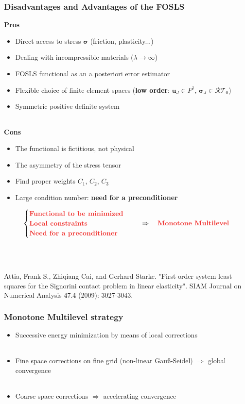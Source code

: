 \documentclass[8pt, oneside]{beamer}   	%
\newcommand{\bu}{\textbf{u}}
\newcommand{\bsigma}{\boldsymbol{\sigma}}
\newcommand{\RT}{\mathcal{RT}}
\newcommand{\colo}{\color{orange}}
\newcommand{\titlecolor}[1]{\frametitle{\textcolor{dkgrey}{ \textbf{#1}}}}
\begin{document}
\begin{frame}
\titlecolor{Disadvantages and Advantages of the FOSLS}
 \textbf{Pros}
\begin{itemize} 
\item Direct access to stress $\bsigma$ (friction, plasticity...)
\item Dealing with incompressible materials ($\lambda \to \infty$)
\item FOSLS functional as an a posteriori error estimator
\item Flexible choice of finite element spaces (\textbf{low order}: $\bu_J \in P^1$, $\bsigma_J \in \RT_0$)
\item Symmetric positive definite system
\end{itemize}
${}$\\
 \textbf{Cons}
\begin{itemize} 
\item The functional is fictitious, not physical
\item The asymmetry of the stress tensor
\item Find proper weights $C_1$, $C_2$, $C_3$
\item Large condition number:  \colo \textbf{need for a preconditioner}
\end{itemize}
\begin{align*}
\begin{cases}
 \colo \textbf{Functional to be minimized }\\
 \colo   \textbf{Local constraints}\\
 \colo \textbf{Need for a preconditioner}
\end{cases}
\quad \Rightarrow \quad \colo \textbf{Monotone Multilevel}
\end{align*}${}$\\
${}$\\
${}$\\
\tiny{Attia, Frank S., Zhiqiang Cai, and Gerhard Starke. "First-order system least squares for the Signorini contact problem in linear elasticity". SIAM Journal on Numerical Analysis 47.4 (2009): 3027-3043.}\\
\end{frame}





\begin{frame}
\titlecolor{Monotone Multilevel strategy}
\begin{itemize}
\item Successive energy minimization by means of local corrections
\\${}$\\
\item Fine space corrections on fine grid (non-linear Gau{\ss}-Seidel) $\Rightarrow$ global convergence
\\${}$\\
\item Coarse space corrections $\Rightarrow$ accelerating convergence
\end{itemize}

\end{frame}
\end{document}
